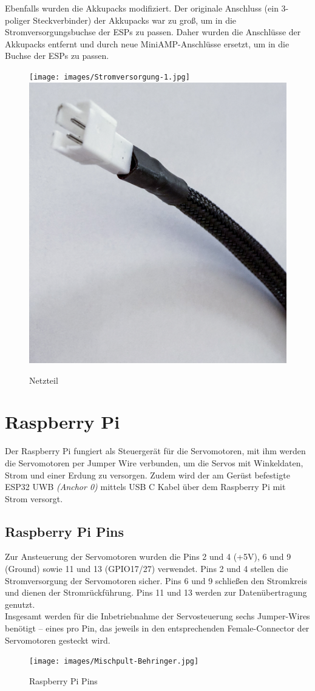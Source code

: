 Ebenfalls wurden die Akkupacks modifiziert. Der originale Anschluss (ein 3-poliger Steckverbinder) der Akkupacks war zu groß, um in die Stromversorgungsbuchse der ESPs zu passen. Daher wurden die Anschlüsse der Akkupacks entfernt und durch neue MiniAMP-Anschlüsse ersetzt, um in die Buchse der ESPs zu passen.

\begin{figure}[H]
	\centering
	\texttt{[image: images/Stromversorgung-1.jpg]}
	\includegraphics[width=0.4\linewidth]{images/Stromversorgung-2.jpg}
	\caption[Netzteil]{Netzteil}
	\label{fig:Netzteil}
\end{figure}

\section{Raspberry Pi}
Der Raspberry Pi fungiert als Steuergerät für die Servomotoren, mit ihm werden die Servomotoren per Jumper Wire verbunden, um die Servos mit Winkeldaten, Strom und einer Erdung zu versorgen. Zudem wird der am Gerüst befestigte ESP32 UWB \textit{(Anchor 0)} mittels USB C Kabel über dem Raspberry Pi mit Strom versorgt. 

\subsection{Raspberry Pi Pins}
Zur Ansteuerung der Servomotoren wurden die Pins 2 und 4 (+5V), 6 und 9 (Ground) sowie 11 und 13 (GPIO17/27) verwendet. Pins 2 und 4 stellen die Stromversorgung der Servomotoren sicher. Pins 6 und 9 schließen den Stromkreis und dienen der Stromrückführung. Pins 11 und 13 werden zur Datenübertragung genutzt.\\
Insgesamt werden für die Inbetriebnahme der Servosteuerung sechs Jumper-Wires benötigt – eines pro Pin, das jeweils in den entsprechenden Female-Connector der Servomotoren gesteckt wird.

\begin{figure}[H]
	\centering
	\texttt{[image: images/Mischpult-Behringer.jpg]}
	\caption[Raspberry Pi Pins]{Raspberry Pi Pins}
	\label{fig: Raspberry Pi Pins}
\end{figure}


